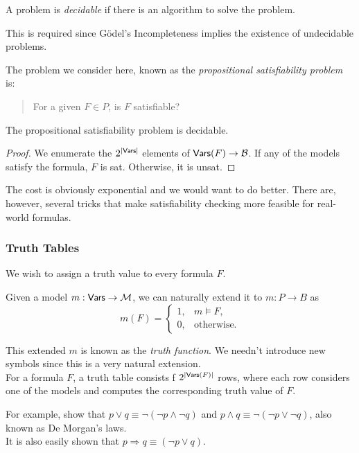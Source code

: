 \begin{fdef}
A problem is \textit{decidable} if there is an algorithm to solve the problem.
\end{fdef}

This is required since G\"odel's Incompleteness implies the existence of undecidable problems.

The problem we consider here, known as the \textit{propositional satisfiability problem} is:
\begin{quote}
For a given $F\in P$, is $F$ satisfiable?
\end{quote}

\begin{theorem}
The propositional satisfiability problem is decidable.
\end{theorem}
\begin{proof}
We enumerate the $2^{|\mathsf{Vars}|}$ elements of $\mathsf{Vars}(F)\to\mathcal{B}$. If any of the models satisfy the formula, $F$ is sat. Otherwise, it is unsat.
\end{proof}

The cost is obviously exponential and we would want to do better. There are, however, several tricks that make satisfiability checking more feasible for real-world formulas.

\subsubsection{Truth Tables}

We wish to assign a truth value to every formula $F$.

Given a model $m:\mathsf{Vars}\to\mathcal{M}$, we can naturally extend it to $m:P\to B$ as
\[
    m(F) = 
    \begin{cases}
    1, & m\vDash F, \\
    0, & \text{otherwise.}
    \end{cases}
\]

This extended $m$ is known as the \textit{truth function}. We needn't introduce new symbols since this is a very natural extension.\\

For a formula $F$, a truth table consists f $2^{|\mathsf{Vars}(F)|}$ rows, where each row considers one of the models and computes the corresponding truth value of $F$.

For example, show that $p\vee q \equiv \neg(\neg p \wedge \neg q)$ and $p\wedge q \equiv \neg(\neg p \vee \neg q)$, also known as De Morgan's laws.\\
It is also easily shown that $p\Rightarrow q \equiv (\neg p \vee q)$.

